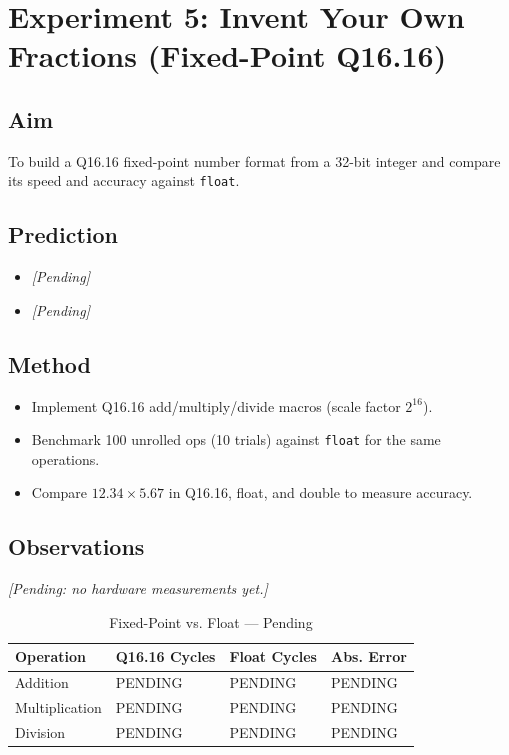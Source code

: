 \section{Experiment 5: Invent Your Own Fractions (Fixed-Point Q16.16)}

\subsection{Aim}
To build a Q16.16 fixed-point number format from a 32-bit integer and compare its speed and accuracy against \texttt{float}.

\subsection{Prediction}
\begin{itemize}[noitemsep]
    \item \textit{[Pending]}
    \item \textit{[Pending]}
\end{itemize}

\subsection{Method}
\begin{itemize}[noitemsep]
    \item Implement Q16.16 add/multiply/divide macros (scale factor $2^{16}$).
    \item Benchmark 100 unrolled ops (10 trials) against \texttt{float} for the same operations.
    \item Compare $12.34 \times 5.67$ in Q16.16, float, and double to measure accuracy.
\end{itemize}

\subsection{Observations}
\textit{[Pending: no hardware measurements yet.]}

\begin{table}[htbp]
\centering
\caption{Fixed-Point vs. Float --- Pending}
\label{tab:exp5_obs}
\small
\begin{tabularx}{\textwidth}{l X X X}
\toprule
\textbf{Operation} & \textbf{Q16.16 Cycles} & \textbf{Float Cycles} & \textbf{Abs. Error} \\
\midrule
Addition & PENDING & PENDING & PENDING \\
Multiplication & PENDING & PENDING & PENDING \\
Division & PENDING & PENDING & PENDING \\
\bottomrule
\end{tabularx}
\end{table}

